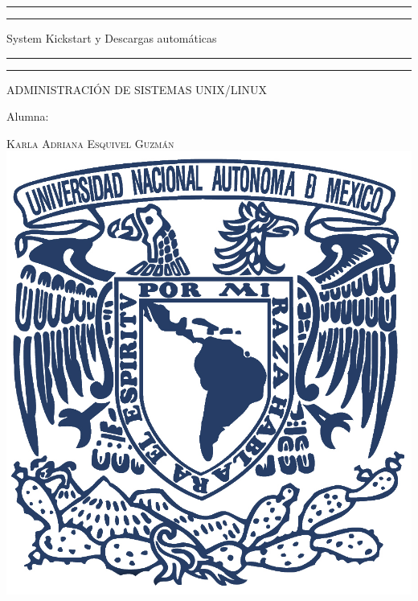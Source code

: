 \documentclass[a4paper, 11pt, oneside]{article}
\begin{document}
 

\begin{titlepage} 

	\centering 
	
	\scshape 
	
	\vspace*{\baselineskip} 
	
	
	
	\rule{\textwidth}{1.6pt}\vspace*{-\baselineskip}\vspace*{2pt} 
	\rule{\textwidth}{0.4pt} 
	
	\vspace{0.75\baselineskip} 
	
	{\LARGE System Kickstart y Descargas automáticas}	
	\vspace{0.75\baselineskip} 
	
	\rule{\textwidth}{0.4pt}\vspace*{-\baselineskip}\vspace{3.2pt}
	\rule{\textwidth}{1.6pt} 
	
	\vspace{2\baselineskip} 
	

	ADMINISTRACIÓN DE SISTEMAS UNIX/LINUX
	
	\vspace*{3\baselineskip} 
	
	
	
	Alumna:
	
	\vspace{0.5\baselineskip} 
	
	{\scshape\Large Karla Adriana Esquivel Guzmán \\} 
	\vspace{0.5\baselineskip} 
	\vfill
	\includegraphics{unam.jpg}
	

\end{titlepage}
\end{document}

